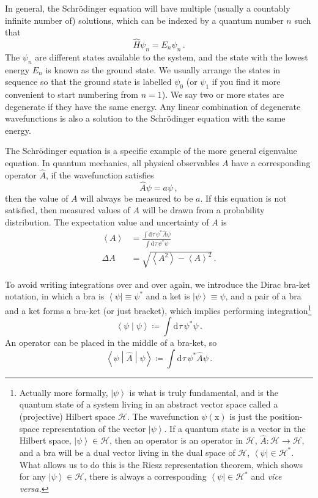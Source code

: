 \documentclass{article}
\theoremstyle{plain}\theoremheaderfont{\normalfont\itshape}\theorembodyfont{\rmfamily}\theoremseparator{.}\newtheorem*{rem}{Remark}\newtheorem*{ex}{Example}\newtheorem*{proof}{Proof}\newtheorem*{altp}{Alternative proof}
\theoremstyle{plain}\theoremheaderfont{\normalfont\bfseries}\theorembodyfont{\rmfamily}\theoremseparator{.}\newtheorem{thm}{Theorem}[section]\newtheorem{lem}[thm]{Lemma}\newtheorem{prop}[thm]{Proposition}\newtheorem*{cor}{Corollary}\newtheorem{defn}[thm]{Definition}\newtheorem{clm}[thm]{Claim}\newtheorem{clminproof}{Claim}
\theoremstyle{break}\theoremheaderfont{\normalfont\itshape}\theorembodyfont{\rmfamily}\theoremseparator{.\medskip}\newtheorem*{proofskip}{Proof}\newtheorem*{exs}{Examples}\newtheorem*{rems}{Remarks}
\theoremstyle{break}\theoremheaderfont{\normalfont\bfseries}\theorembodyfont{\rmfamily}\theoremseparator{.\medskip}\newtheorem{lemskip}[thm]{Lemma}\newtheorem{defnskip}[thm]{Definition}\newtheorem{propskip}[thm]{Proposition}\newtheorem{thmskip}[thm]{Theorem}
\numberwithin{equation}{section}
\newcommand{\dd}[2][]{\mathrm{d}^{#1} #2\,}
\newcommand{\bra}[1]{\left\langle #1 \right|}
\newcommand{\ket}[1]{\left| #1 \right\rangle}
\newcommand{\braket}[2]{\left\langle #1 \middle| #2 \right\rangle}
\newcommand{\mel}[3]{\left\langle #1 \middle| #2 \middle| #3 \right\rangle}
\newcommand{\eval}[1]{\left\langle #1 \right\rangle}
\newcommand{\vb}[1]{\bm{\mathrm{#1}}}
\begin{document}
    In general, the Schr\"{o}dinger equation will have multiple (usually a countably infinite number of) solutions, which can be indexed by a quantum number \(n\) such that
    \begin{equation}
        \hat{H}\psi_n=E_n\psi_n\,.
    \end{equation}
    The \(\psi_n\) are different states available to the system, and the state with the lowest energy \(E_n\) is known as the ground state. We usually arrange the states in sequence so that the ground state is labelled \(\psi_0\) (or \(\psi_1\) if you find it more convenient to start numbering from \(n=1\)). We say two or more states are degenerate if they have the same energy. Any linear combination of degenerate wavefunctions is also a solution to the Schr\"{o}dinger equation with the same energy.

    The Schr\"{o}dinger equation is a specific example of the more general eigenvalue equation. In quantum mechanics, all physical observables \(A\) have a corresponding operator \(\hat{A}\), if the wavefunction satisfies
    \begin{equation}
        \hat{A}\psi=a\psi\,,
    \end{equation}
    then the value of \(A\) will always be measured to be \(a\). If this equation is not satisfied, then measured values of \(A\) will be drawn from a probability distribution. The expectation value and uncertainty of \(A\) is
    \begin{align}
        \eval{A}&=\frac{\int\dd{\tau}\psi^*\hat{A}\psi}{\int\dd{\tau}\psi^*\psi}\\
        \Delta A&=\sqrt{\eval{A^2}-\eval{A}^2}\,.
    \end{align}

    To avoid writing integrations over and over again, we introduce the Dirac bra-ket notation, in which a bra is \(\bra{\psi}\equiv\psi^*\) and a ket is \(\ket{\psi}\equiv\psi\), and a pair of a bra and a ket forms a bra-ket (or just bracket), which implies performing integration\footnote{Actually more formally, \(\ket{\psi}\) is what is truly fundamental, and is the quantum state of a system living in an abstract vector space called a (projective) Hilbert space \(\mathcal{H}\). The wavefunction \(\psi(\vb{x})\) is just the position-space representation of the vector \(\ket{\psi}\). If a quantum state is a vector in the Hilbert space, \(\ket{\psi}\in\mathcal{H}\), then an operator is an operator in \(\mathcal{H}\), \(\hat{A}:\mathcal{H}\to\mathcal{H}\), and a bra will be a dual vector living in the dual space of \(\mathcal{H}\), \(\bra{\psi}\in\mathcal{H}^*\). What allows us to do this is the Riesz representation theorem, which shows for any \(\ket{\psi}\in\mathcal{H}\), there is always a corresponding \(\bra{\psi}\in\mathcal{H}^*\) and \textit{vice versa.}}
    \begin{equation}
        \braket{\psi}{\psi}\coloneqq\int\dd{\tau}\psi^*\psi\,.
    \end{equation}
    An operator can be placed in the middle of a bra-ket, so
    \begin{equation}
        \mel{\psi}{\hat{A}}{\psi}\coloneqq\int\dd{\tau}\psi^*\hat{A}\psi\,.
    \end{equation}
\end{document}
